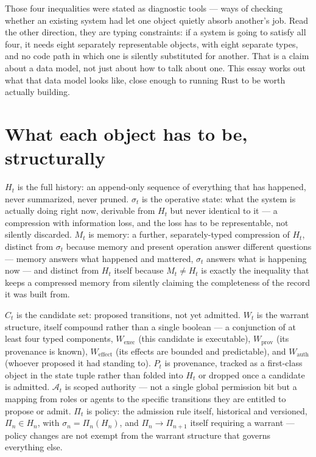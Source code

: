 \documentclass[11pt,openany]{book}
\begin{document}
Those four inequalities were stated as diagnostic tools — ways of checking whether an existing system had let one object quietly absorb another's job. Read the other direction, they are typing constraints: if a system is going to satisfy all four, it needs eight separately representable objects, with eight separate types, and no code path in which one is silently substituted for another. That is a claim about a data model, not just about how to talk about one. This essay works out what that data model looks like, close enough to running Rust to be worth actually building.

\section{What each object has to be, structurally}

$H_t$ is the full history: an append-only sequence of everything that has happened, never summarized, never pruned. $\sigma_t$ is the operative state: what the system is actually doing right now, derivable from $H_t$ but never identical to it — a compression with information loss, and the loss has to be representable, not silently discarded. $M_t$ is memory: a further, separately-typed compression of $H_t$, distinct from $\sigma_t$ because memory and present operation answer different questions — memory answers what happened and mattered, $\sigma_t$ answers what is happening now — and distinct from $H_t$ itself because $M_t \neq H_t$ is exactly the inequality that keeps a compressed memory from silently claiming the completeness of the record it was built from.

$C_t$ is the candidate set: proposed transitions, not yet admitted. $W_t$ is the warrant structure, itself compound rather than a single boolean — a conjunction of at least four typed components, $W_{\mathrm{exec}}$ (this candidate is executable), $W_{\mathrm{prov}}$ (its provenance is known), $W_{\mathrm{effect}}$ (its effects are bounded and predictable), and $W_{\mathrm{auth}}$ (whoever proposed it had standing to). $P_t$ is provenance, tracked as a first-class object in the state tuple rather than folded into $H_t$ or dropped once a candidate is admitted. $\mathcal{A}_t$ is scoped authority — not a single global permission bit but a mapping from roles or agents to the specific transitions they are entitled to propose or admit. $\Pi_t$ is policy: the admission rule itself, historical and versioned, $\Pi_n \in H_n$, with $\sigma_n = \Pi_n(H_n)$, and $\Pi_n \to \Pi_{n+1}$ itself requiring a warrant — policy changes are not exempt from the warrant structure that governs everything else.
\end{document}
